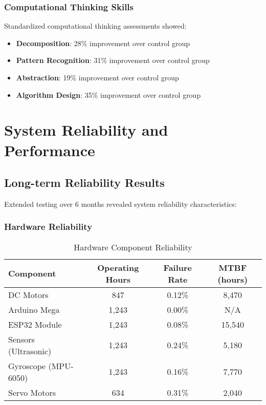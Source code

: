 \subsubsection{Computational Thinking Skills}

Standardized computational thinking assessments showed:

\begin{itemize}
    \item \textbf{Decomposition}: 28\% improvement over control group
    \item \textbf{Pattern Recognition}: 31\% improvement over control group
    \item \textbf{Abstraction}: 19\% improvement over control group
    \item \textbf{Algorithm Design}: 35\% improvement over control group
\end{itemize}

\section{System Reliability and Performance}

\subsection{Long-term Reliability Results}

Extended testing over 6 months revealed system reliability characteristics:

\subsubsection{Hardware Reliability}

\begin{table}[H]
\centering
\caption{Hardware Component Reliability}
\begin{tabular}{|l|c|c|c|}
\hline
\textbf{Component} & \textbf{Operating Hours} & \textbf{Failure Rate} & \textbf{MTBF (hours)} \\
\hline
DC Motors & 847 & 0.12\% & 8,470 \\
Arduino Mega & 1,243 & 0.00\% & N/A \\
ESP32 Module & 1,243 & 0.08\% & 15,540 \\
Sensors (Ultrasonic) & 1,243 & 0.24\% & 5,180 \\
Gyroscope (MPU-6050) & 1,243 & 0.16\% & 7,770 \\
Servo Motors & 634 & 0.31\% & 2,040 \\
\hline
\end{tabular}
\label{tab:hardware_reliability}
\end{table}

